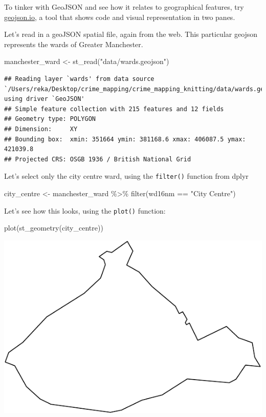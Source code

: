 \documentclass[
]{book}
\newenvironment{Shaded}{\begin{snugshade}}{\end{snugshade}}
\newcommand{\FunctionTok}[1]{\textcolor[rgb]{0.00,0.00,0.00}{#1}}
\newcommand{\NormalTok}[1]{#1}
\newcommand{\OtherTok}[1]{\textcolor[rgb]{0.56,0.35,0.01}{#1}}
\newcommand{\SpecialCharTok}[1]{\textcolor[rgb]{0.00,0.00,0.00}{#1}}
\newcommand{\StringTok}[1]{\textcolor[rgb]{0.31,0.60,0.02}{#1}}
\begin{document}
To tinker with GeoJSON and see how it relates to geographical features, try \url{geojson.io}, a tool that shows code and visual representation in two panes.

Let's read in a geoJSON spatial file, again from the web. This particular geojson represents the wards of Greater Manchester.

\begin{Shaded}
\begin{Highlighting}[]
\NormalTok{manchester\_ward }\OtherTok{\textless{}{-}} \FunctionTok{st\_read}\NormalTok{(}\StringTok{"data/wards.geojson"}\NormalTok{)}
\end{Highlighting}
\end{Shaded}

\begin{verbatim}
## Reading layer `wards' from data source `/Users/reka/Desktop/crime_mapping/crime_mapping_knitting/data/wards.geojson' using driver `GeoJSON'
## Simple feature collection with 215 features and 12 fields
## Geometry type: POLYGON
## Dimension:     XY
## Bounding box:  xmin: 351664 ymin: 381168.6 xmax: 406087.5 ymax: 421039.8
## Projected CRS: OSGB 1936 / British National Grid
\end{verbatim}

Let's select only the city centre ward, using the \texttt{filter()} function from dplyr

\begin{Shaded}
\begin{Highlighting}[]
\NormalTok{city\_centre }\OtherTok{\textless{}{-}}\NormalTok{ manchester\_ward }\SpecialCharTok{\%\textgreater{}\%}
  \FunctionTok{filter}\NormalTok{(wd16nm }\SpecialCharTok{==} \StringTok{"City Centre"}\NormalTok{)}
\end{Highlighting}
\end{Shaded}

Let's see how this looks, using the \texttt{plot()} function:

\begin{Shaded}
\begin{Highlighting}[]
\FunctionTok{plot}\NormalTok{(}\FunctionTok{st\_geometry}\NormalTok{(city\_centre))}
\end{Highlighting}
\end{Shaded}

\includegraphics{crime_mapping_files/figure-latex/plot_2b-1.pdf}
\end{document}
